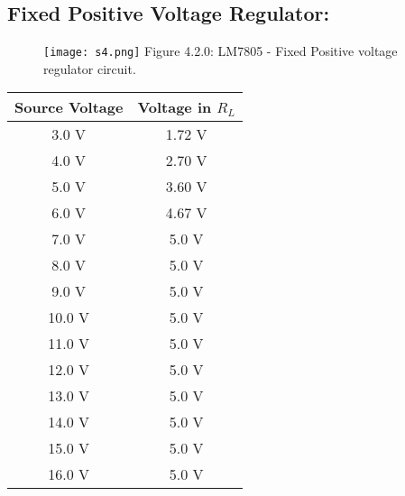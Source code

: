 \subsection{Fixed Positive Voltage Regulator:}

\begin{multicols}{2}
\begin{tasks}
\begin{figure}[H]
\texttt{[image: s4.png]}
\centering \linebreak \linebreak Figure 4.2.0: LM7805 - Fixed Positive voltage regulator circuit.
\end{figure}
\begin{center}
\begin{tabular}[.5cm]{ c c }
\toprule
Source Voltage & Voltage in $R_{L}$ \\
\midrule
3.0 V & 1.72 V \\
\cmidrule{1-2}
4.0 V & 2.70 V \\
\cmidrule{1-2}
5.0 V & 3.60 V \\
\cmidrule{1-2}
6.0 V & 4.67 V \\
\cmidrule{1-2}
7.0 V & 5.0 V \\
\cmidrule{1-2}
8.0 V & 5.0 V \\
\cmidrule{1-2}
9.0 V & 5.0 V \\
\cmidrule{1-2}
10.0 V & 5.0 V \\
\cmidrule{1-2}
11.0 V & 5.0 V \\
\cmidrule{1-2}
12.0 V & 5.0 V \\
\cmidrule{1-2}
13.0 V & 5.0 V \\
\cmidrule{1-2}
14.0 V & 5.0 V \\
\cmidrule{1-2}
15.0 V & 5.0 V \\
\cmidrule{1-2}
16.0 V & 5.0 V \\
\bottomrule
\end{tabular}
\end{center} 


\end{tasks}
\end{multicols}
